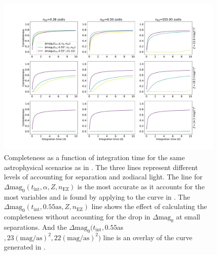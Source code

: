 \begin{figure}
  \begin{center}
    \includegraphics[width=\textwidth]{ch3/figures/Z_EZ_comps_flat.pdf}
  \end{center}
  \caption{Completeness as a function of integration time for the same astrophysical
  scenarios as in . The three lines represent different levels
  of accounting for separation and zodiacal light. The line for
  $\Delta\textrm{mag}_0(t_\textrm{int}, \alpha, Z, n_\textrm{EZ})$
  is the most accurate as it accounts for the most variables and is 
  found by applying  to the curve in .
  The 
  $\Delta\textrm{mag}_0(t_\textrm{int}, 0.55\textrm{as}, Z, n_\textrm{EZ})$
  line shows the effect of calculating the completeness without accounting for
  the drop in $\Delta\textrm{mag}_0$ at small separations. And the
  $\Delta\mathrm{mag}_0(t_\mathrm{int}, 0.55$\textrm{as}$, 23 (\textrm{mag}/\textrm{as})^2, 22(\textrm{mag}/\textrm{as})^2)$
  line is an overlay of the curve generated in .
  }
  \label{fig:fZ_fEZ_comps}
\end{figure}

